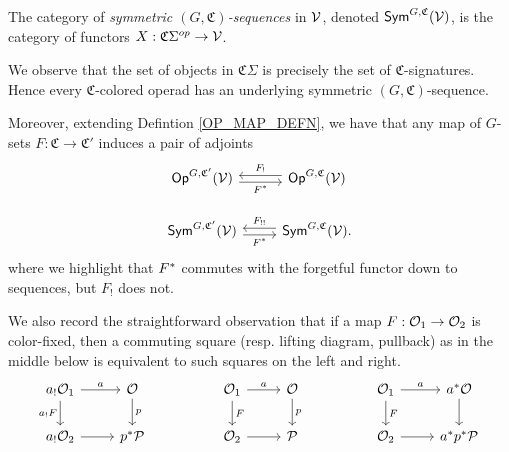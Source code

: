 \documentclass[a4paper,10pt
,draft
]{article}%
\renewcommand{\1}{\ensuremath{\mathbb{id}}}
\begin{document}
\begin{definition}
      The category of \textit{symmetric $(G,\mathfrak C)$-sequences} in $\mathcal V$, denoted $\mathsf{Sym}^{G,\mathfrak C}(\mathcal V)$, is
      the category of functors $X: \mathfrak C \Sigma^{op} \to \mathcal V$.
\end{definition}

\begin{remark}
      \label{COLOR_CHANGE_REM}
      We observe that the set of objects in $\mathfrak C\Sigma$ is precisely the set of $\mathfrak C$-signatures.
      Hence every $\mathfrak C$-colored operad has an underlying symmetric $(G,\mathfrak C)$-sequence.
      
      Moreover, extending Defintion \ref{OP_MAP_DEFN}, we have that any map of $G$-sets
      $F: \mathfrak C \to \mathfrak C'$ induces a pair of adjoints
      \begin{equation}
            \label{COLOR_CHANGE_EQ}
            \begin{tikzcd}
                  \Op^{G, \mathfrak C'}(\V) \arrow[r, shift right, "F^{\**}"'] %
                  &
                  \Op^{G, \mathfrak C}(\V) \arrow[l, shift right, "F_!"'] %
                  \\
                  \Sym^{G, \mathfrak C'}(\V) \arrow[r, shift right, "F^{\**}"']
                  &
                  \Sym^{G, \mathfrak C}(\V) \arrow[l, shift right, "F_{!!}"'].
            \end{tikzcd}
      \end{equation}
      where we highlight that $F^{\**}$ commutes with the forgetful functor down to sequences, but $F_!$ does not.
      
      We also record the straightforward observation that if a map $F: \mathcal{O}_1 \to \mathcal{O}_2$ is color-fixed, then
      a commuting square (resp. lifting diagram, pullback) as in the middle below is
      equivalent to such squares on the left and right.
      \begin{equation}
            \label{COLOR_SQ_EQ}
            \begin{tikzcd}
                  a_! \O_1 \arrow[d, "a_! F"'] \arrow[r, "a"]
                  &
                  \O \arrow[d, "p"]
                  &&
                  \O_1 \arrow[d, "F"] \arrow[r, "a"]
                  &
                  \O \arrow[d, "p"]
                  &&
                  \O_1 \arrow[d, "F"] \arrow[r, "a"]
                  &
                  a^{\**} \O \arrow[d]
                  \\
                  a_! \O_2 \arrow[r]
                  &
                  p^{\**} \P
                  &&
                  \O_2 \arrow[r]
                  &
                  \P
                  &&
                  \O_2 \arrow[r]
                  &
                  a^{\**} p^{\**} \P
            \end{tikzcd}
      \end{equation}
\end{remark}
\end{document}
